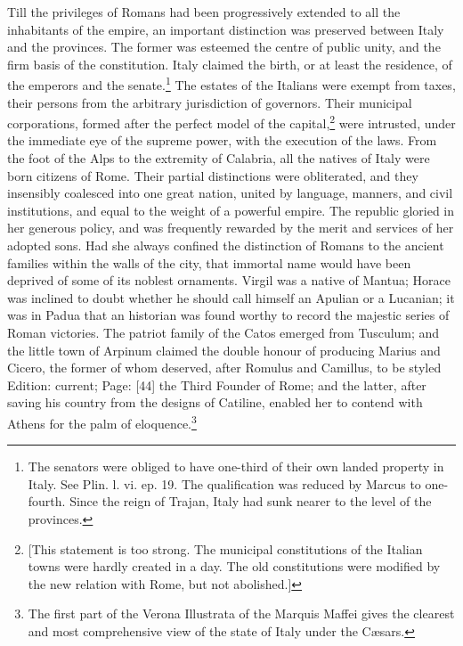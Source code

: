 Till the privileges of Romans had been progressively extended to all the inhabitants of the empire, an important distinction was preserved between Italy and the provinces. The former was esteemed the centre of public unity, and the firm basis of the constitution. Italy claimed the birth, or at least the residence, of the emperors and the senate.\footnote{The senators were obliged to have one-third of their own landed property in Italy. See Plin. l. vi. ep. 19. The qualification was reduced by Marcus to one-fourth. Since the reign of Trajan, Italy had sunk nearer to the level of the provinces.} The estates of the Italians were exempt from taxes, their persons from the arbitrary jurisdiction of governors. Their municipal corporations, formed after the perfect model of the capital,\footnote{[This statement is too strong. The municipal constitutions of the Italian towns were hardly created in a day. The old constitutions were modified by the new relation with Rome, but not abolished.]} were intrusted, under the immediate eye of the supreme power, with the execution of the laws. From the foot of the Alps to the extremity of Calabria, all the natives of Italy were born citizens of Rome. Their partial distinctions were obliterated, and they insensibly coalesced into one great nation, united by language, manners, and civil institutions, and equal to the weight of a powerful empire. The republic gloried in her generous policy, and was frequently rewarded by the merit and services of her adopted sons. Had she always confined the distinction of Romans to the ancient families within the walls of the city, that immortal name would have been deprived of some of its noblest ornaments. Virgil was a native of Mantua; Horace was inclined to doubt whether he should call himself an Apulian or a Lucanian; it was in Padua that an historian was found worthy to record the majestic series of Roman victories. The patriot family of the Catos emerged from Tusculum; and the little town of Arpinum claimed the double honour of producing Marius and Cicero, the former of whom deserved, after Romulus and Camillus, to be styled Edition: current; Page: [44] the Third Founder of Rome; and the latter, after saving his country from the designs of Catiline, enabled her to contend with Athens for the palm of eloquence.\footnote{The first part of the Verona Illustrata of the Marquis Maffei gives the clearest and most comprehensive view of the state of Italy under the Cæsars.}

